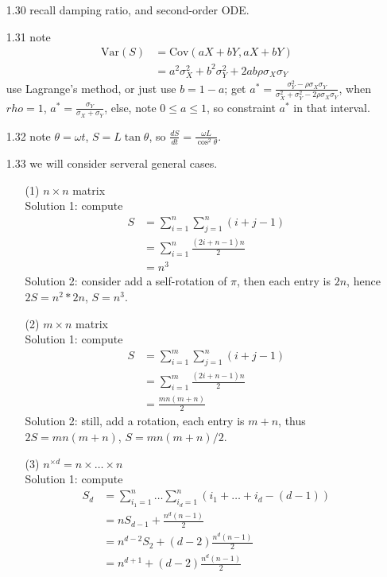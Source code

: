 \documentclass[paper=a4, fontsize=11pt]{scrartcl} %
\numberwithin{equation}{section} %
\numberwithin{figure}{section} %
\numberwithin{table}{section} %
\def \cov {\text{Cov}}
\def \var {\text{Var}}
\begin{document}
\begin{itemize}
	\item[1.30] recall damping ratio, and second-order ODE.
	\item[1.31] note
	\begin{align}
		\var(S) &= \cov(aX+bY, aX+bY)\\
			&= a^2\sigma_X^2 + b^2\sigma_Y^2  + 2ab\rho \sigma_X\sigma_Y
	\end{align}
	use Lagrange's method, or just use $b=1-a$; get $a^* = \frac{\sigma_Y^2-\rho \sigma_X\sigma_Y}{\sigma_X^2+\sigma_Y^2-2\rho\sigma_X\sigma_Y}$, when $rho=1$, $a^*= \frac{\sigma_Y}{\sigma_X+\sigma_Y}$, else, note $0\leq a\leq 1$, so constraint $a^*$ in that interval.
	\item[1.32] note $\theta = \omega t$, $S=L\tan \theta$, so $\frac{dS}{dt}=\frac{\omega L}{\cos^2\theta}$.
	\item[1.33] we will consider serveral general cases.
	\begin{itemize}
		\item[(1)] $n\times n$ matrix\\
			Solution 1: compute
			\begin{align}
				S &= \sum_{i=1}^n\sum_{j=1}^n (i+j-1)\\
					&= \sum_{i=1}^n \frac{(2i+n-1)n}{2}\\
					&= n^3
			\end{align}
			Solution 2: consider add a self-rotation of $\pi$, then each entry is $2n$, hence $2S = n^2*2n$, $S=n^3$.
		\item[(2)] $m\times n$ matrix\\
			Solution 1: compute
			\begin{align}
				S &= \sum_{i=1}^m \sum_{j=1}^n (i+j-1)\\
					&= \sum_{i=1}^m \frac{(2i+n-1)n}{2}\\
					&= \frac{mn(m+n)}{2}
			\end{align}
			Solution 2: still, add a rotation, each entry is $m+n$, thus $2S=mn(m+n)$, $S=mn(m+n)/2$.
		\item[(3)] $n^{\times d}=n\times \dots\times n$\\
			Solution 1: compute
			\begin{align}
				S_d &= \sum_{i_1 = 1}^n\dots\sum_{i_d = 1}^n (i_1+\dots+i_d-(d-1))\\
					&= nS_{d-1} + \frac{n^d(n-1)}{2}\\
					&= n^{d-2} S_2 + (d-2)\frac{n^d(n-1)}{2}\\
					&= n^{d+1} + (d-2)\frac{n^d(n-1)}{2}\\

\end{align}
\end{itemize}
\end{itemize}
\end{document}
